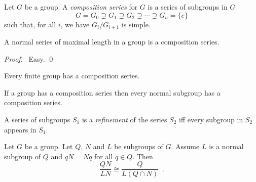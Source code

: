 \begin{df}
Let $G$ be a group. A \emph{composition series} for $G$ is a series of subgroups in $G$
\[ G = G_0 \supsetneq G_1 \supsetneq G_2 \supsetneq \cdots \supsetneq G_n = \{e\} \]
such that, for all $i$, we have $G_i / G_{i+1}$ is simple.
\end{df}

\begin{prop}
A normal series of maximal length in a group is a composition series.
\end{prop}

\begin{proof}
\pf\ Easy. \qed
\end{proof}

\begin{cor}
Every finite group has a composition series.
\end{cor}

\begin{cor}
If a group has a composition series then every normal subgroup has a composition series.
\end{cor}

\begin{df}[Refinement]
A series of subgroups $S_1$ is a \emph{refinement} of the series $S_2$ iff every subgroup in $S_2$ appears in $S_1$.
\end{df}

\begin{lm}
\label{lm:Schreier}
Let $G$ be a group. Let $Q$, $N$ and $L$ be subgroups of $G$. Assume $L$ is a normal subgroup of $Q$ and $qN = Nq$ for all $q \in Q$. Then
\[ \frac{QN}{LN} \cong \frac{Q}{L(Q \cap N)} \enspace . \]
\end{lm}

